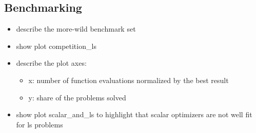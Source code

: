 \subsection{Benchmarking}
\label{subsec:benchmark-core-algo}
\begin{itemize}
    \item describe the more-wild benchmark set
    \item show plot competition\_ls
    \item describe the plot axes:
    \begin{itemize}
            \item x: number of function evaluations normalized by the best result
            \item y: share of the problems solved
        \end{itemize}
        \item show plot scalar\_and\_ls to highlight that scalar optimizers are not well fit for ls problems
    \end{itemize}




